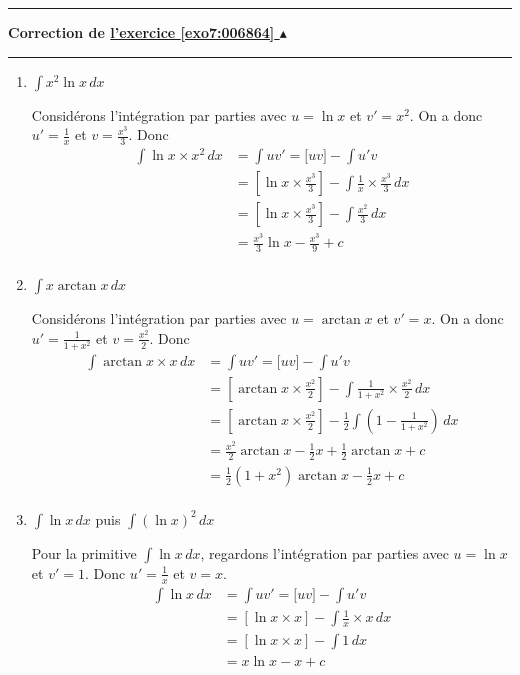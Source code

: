 \documentclass[11pt,a4paper]{article}
\newcounter{exo}
\newcommand{\correction}[1]{\hypertarget{cor7:#1}{}\label{cor7:#1}{\bf Correction de \hyperlink{exo7:#1}{l'exercice \ref{exo7:#1} $\blacktriangle$}}\vspace{1mm}\hrule\vspace{1mm}}
\newcommand{\fincorrection}{\vspace{1mm}\hrule\vspace*{7mm}}
\begin{document}
\fincorrection
\correction{006864}
\begin{enumerate}
  \item $\int x^2 \ln x \, dx$

Considérons l'intégration par parties avec $u=\ln x$ et $v'=x^2$.
On a donc $u'=\frac 1x$ et $v = \frac{x^3}3$.
Donc
\begin{align*}
\int  \ln x \times x^2\, dx 
  &= \int uv' = \big[ uv \big] - \int u'v \\
  &= \left[ \ln x \times \frac{x^3}3 \right] - \int  \frac 1x\times\frac{x^3}3  \, dx \\
  &= \left[ \ln x  \times \frac{x^3}3\right] - \int \frac{x^2}3 \, dx \\
  &= \frac{x^3}3 \ln x - \frac{x^3}9 + c \\
\end{align*}


  \item $\int x \arctan x \, dx$

Considérons l'intégration par parties avec $u=\arctan x$ et $v'=x$.
On a donc $u'=\frac 1{1+x^2}$ et $v = \frac{x^2}2$.
Donc
\begin{align*}
\int  \arctan x \times x \, dx 
&= \int uv' = \big[ uv \big] - \int u'v \\
&= \left[ \arctan x \times \frac{x^2}2  \right] - \int \frac 1{1+x^2} \times\frac{x^2}2  \, dx  \\
&= \left[  \arctan x \times \frac{x^2}2\right] - \frac12 \int \left( 1 -  \frac 1{1+x^2} \right)\, dx  \\
&= \frac{x^2}2  \arctan x -\frac 12 x + \frac 12 \arctan x + c \\
&= \frac 12 (1+x^2) \arctan x -\frac 12 x+ c \\
\end{align*}

  \item $\int \ln x \, dx$ puis $\int (\ln x)^2 \, dx$

Pour la primitive $\int \ln x \, dx$, regardons l'intégration par parties avec $u=\ln x$ et $v'=1$.
Donc $u' = \frac 1x$ et $v=x$.
\begin{align*}
\int \ln x \, dx
&= \int uv' = \big[ uv \big] - \int u'v \\
&= \left[ \ln x \times x \right] - \int \frac 1x \times x \, dx \\
&= \left[  \ln x \times x \right] - \int 1 \, dx \\
&= x\ln x - x + c \\
\end{align*}


\end{enumerate}
\end{document}
